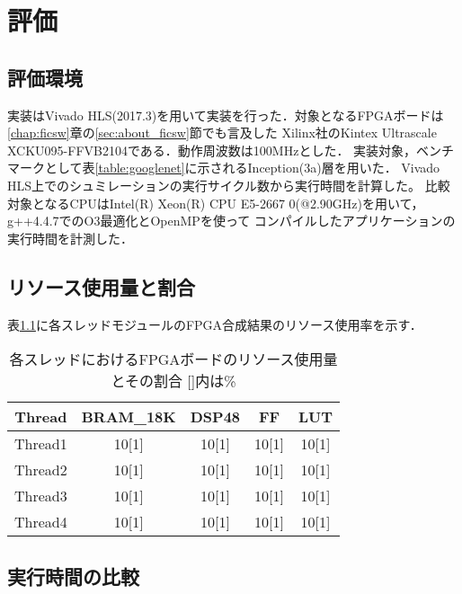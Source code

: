 \chapter{評価}
{
\label{chap:eval}

\section{評価環境}
\label{sec:eval_env}
実装はVivado HLS(2017.3)を用いて実装を行った．対象となるFPGAボードは\ref{chap:ficsw}章の\ref{sec:about_ficsw}節でも言及した
Xilinx社のKintex Ultrascale　XCKU095-FFVB2104である．動作周波数は100MHzとした．
実装対象，ベンチマークとして表\ref{table:googlenet}に示されるInception(3a)層を用いた．
Vivado HLS上でのシュミレーションの実行サイクル数から実行時間を計算した。
比較対象となるCPUはIntel(R) Xeon(R) CPU E5-2667 0(@2.90GHz)を用いて，g++4.4.7でのO3最適化とOpenMPを使って
コンパイルしたアプリケーションの実行時間を計測した．

\section{リソース使用量と割合}
\label{sec:resource_util}
表\ref{table:resource_util}に各スレッドモジュールのFPGA合成結果のリソース使用率を示す．

\begin{table}[p]
    \begin{center}
    \caption{各スレッドにおけるFPGAボードのリソース使用量とその割合 []内は\%}
    \label{table:resource_util}
    \begin{tabular}{|c|c|c|c|c|} \hline
    \multicolumn{1}{|c|}{Thread} & \multicolumn{1}{|c|}{BRAM\_18K} & \multicolumn{1}{|c|}{DSP48} & \multicolumn{1}{|c|}{FF} & \multicolumn{1}{|c|}{LUT} \\ \hline \hline
    Thread1       & 10[1] & 10[1] & 10[1] & 10[1] \\ \hline
    Thread2       & 10[1] & 10[1] & 10[1] & 10[1] \\ \hline
    Thread3       & 10[1] & 10[1] & 10[1] & 10[1] \\ \hline
    Thread4       & 10[1] & 10[1] & 10[1] & 10[1] \\ \hline
    \end{tabular}
    \end{center}
\end{table}


\section{実行時間の比較}
\label{sec:resource_util}

}
